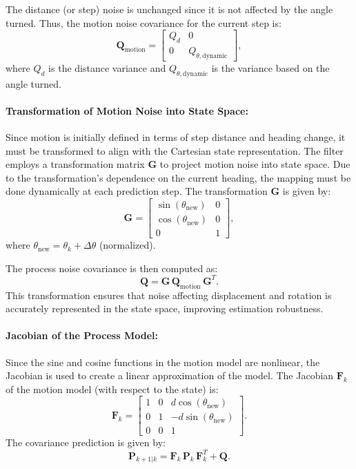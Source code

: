 The distance (or step) noise is unchanged since it is not affected by the angle turned. Thus, the motion noise covariance for the current step is:
\[
\bm{Q}_{\text{motion}} = \begin{bmatrix} Q_{d} & 0 \\ 0 & Q_{\theta,\text{dynamic}} \end{bmatrix},
\]
where \(Q_d\) is the distance variance and \(Q_{\theta,\text{dynamic}}\) is the variance based on the angle turned.

\paragraph{Transformation of Motion Noise into State Space:}  
Since motion is initially defined in terms of step distance and heading change, it must be transformed to align with the Cartesian state representation. The filter employs a transformation matrix \(\bm{G}\) to project motion noise into state space. Due to the transformation's dependence on the current heading, the mapping must be done dynamically at each prediction step. The transformation \(\bm{G}\) is given by:
\[
\bm{G} = 
\begin{bmatrix}
\sin(\theta_{\text{new}}) & 0\\[1mm]
\cos(\theta_{\text{new}}) & 0\\[1mm]
0 & 1
\end{bmatrix},
\]
where \(\theta_{\text{new}} = \theta_k + \Delta\theta\) (normalized).

The process noise covariance is then computed as:
\[
\bm{Q} = \bm{G} \, \bm{Q}_{\text{motion}} \, \bm{G}^T.
\]
This transformation ensures that noise affecting displacement and rotation is accurately represented in the state space, improving estimation robustness.

\paragraph{Jacobian of the Process Model:}  
Since the sine and cosine functions in the motion model are nonlinear, the Jacobian is used to create a linear approximation of the model. The Jacobian \(\bm{F}_k\) of the motion model (with respect to the state) is:
\[
\bm{F}_k =
\begin{bmatrix}
1 & 0 & d \cos(\theta_{\text{new}}) \\[1mm]
0 & 1 & -d \sin(\theta_{\text{new}}) \\[1mm]
0 & 0 & 1
\end{bmatrix}.
\]
The covariance prediction is given by:
\[
\bm{P}_{k+1|k} = \bm{F}_k\, \bm{P}_k\, \bm{F}_k^T + \bm{Q}.
\]


